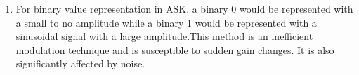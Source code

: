 \documentclass[11pt]{article}
\begin{document}
\begin{enumerate}[label=(\alph*)]
\item For binary value representation in ASK, a binary 0 would be represented with a small to no amplitude while a binary 1 would be represented with a sinusoidal signal with a large amplitude.This method is an inefficient modulation technique and is susceptible to sudden gain changes. It is also significantly affected by noise.
\\ \\ \\ \\ \\ \\ \\ \\ \\ \\ \\ \break


\end{enumerate}
\end{document}
